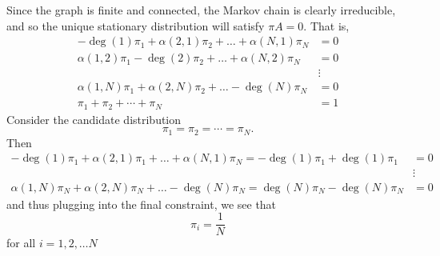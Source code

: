 \documentclass[11pt]{article}
\begin{document}
\begin{solution}
    Since the graph is finite and connected, the Markov chain is clearly irreducible, and so the unique stationary distribution will satisfy $\pi A = 0.$ That is,
    \begin{align*}
        -\deg(1)\pi_1 + \alpha(2,1)\pi_2 + \dots + \alpha(N,1)\pi_N &= 0\\
        \alpha(1,2)\pi_1 -\deg(2)\pi_2 + \dots + \alpha(N,2)\pi_N &= 0\\
        &\vdots\\
        \alpha(1,N)\pi_1 + \alpha(2,N)\pi_2 + \dots -\deg(N)\pi_N &= 0\\
        \pi_1 + \pi_2 + \cdots +\pi_N &=1
    \end{align*}
    Consider the candidate distribution 
    \[\pi_1 = \pi_2 = \cdots = \pi_N.\] Then
    \begin{align*}
        -\deg(1)\pi_1 + \alpha(2,1)\pi_1 + \dots + \alpha(N,1)\pi_N = -\deg(1)\pi_1 + \deg(1)\pi_1&=  0\\
        &\vdots\\
        \alpha(1,N)\pi_N + \alpha(2,N)\pi_N + \dots -\deg(N)\pi_N  = \deg(N)\pi_N - \deg(N)\pi_N&= 0
    \end{align*}
    and thus plugging into the final constraint, we see that 
    \[\boxed{\pi_i = \frac{1}{N}}\] for all $i = 1,2,\dots N$
\end{solution}
\end{document}
